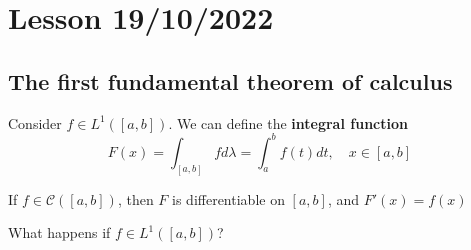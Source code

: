 \section{Lesson 19/10/2022}
\subsection*{The first fundamental theorem of calculus}

Consider \(f \in L^1\left([a,b]\right)\). We can define the \textbf{integral function}
\[F(x) = \int_{[a,b]} f d\lambda = \int_a^b f(t)dt , \quad x \in [a,b]\]

If \(f \in \mathcal{C}\left(\left[a, b\right]\right)\), then \(F\) is differentiable on \(\left[a, b\right]\), and \(F'(x)=f(x)\)

What happens if \(f \in L^1([a, b])\)?



